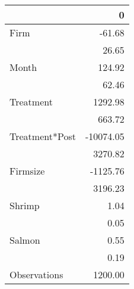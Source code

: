 \begin{tabular}{lr}
\toprule
{} &         0 \\
\midrule
Firm           &    -61.68 \\
               &     26.65 \\
Month          &    124.92 \\
               &     62.46 \\
Treatment      &   1292.98 \\
               &    663.72 \\
Treatment*Post & -10074.05 \\
               &   3270.82 \\
Firmsize       &  -1125.76 \\
               &   3196.23 \\
Shrimp         &      1.04 \\
               &      0.05 \\
Salmon         &      0.55 \\
               &      0.19 \\
Observations   &   1200.00 \\
\bottomrule
\end{tabular}
